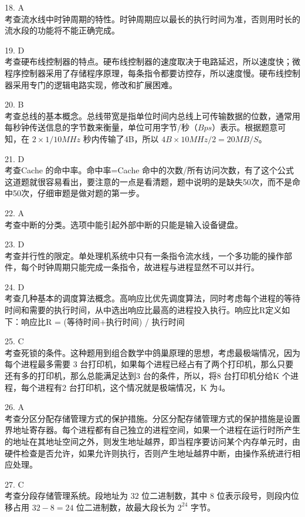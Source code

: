 18. A \\
考查流水线中时钟周期的特性。时钟周期应以最长的执行时间为准，否则用时长的流水段的功能将不能正确完成。

19. D \\
考查硬布线控制器的特点。硬布线控制器的速度取决于电路延迟，所以速度快；微程序控制器采用了存储程序原理，每条指令都要访控存，所以速度慢。硬布线控制器采用专门的逻辑电路实现，修改和扩展困难。

20. B \\
考查总线的基本概念。总线带宽是指单位时间内总线上可传输数据的位数，通常用每秒钟传送信息的字节数来衡量，单位可用字节/秒（$Bps$）表示。根据题意可知，在 $2\times1/10MHz$ 秒内传输了4B，所以 $4B\times10MHz/2=20MB/S$。

21. D \\
考查Cache 的命中率。命中率=Cache 命中的次数/所有访问次数，有了这个公式这道题就很容易看出，要注意的一点是看清题，题中说明的是缺失50次，而不是命中50次，仔细审题是做对题的第一步。

22. A \\
考查中断的分类。选项中能引起外部中断的只能是输入设备键盘。

23. D \\
考查并行性的限定。单处理机系统中只有一条指令流水线，一个多功能的操作部件，每个时钟周期只能完成一条指令，故进程与进程显然不可以并行。

24. D \\
考查几种基本的调度算法概念。高响应比优先调度算法，同时考虑每个进程的等待时间和需要的执行时间，从中选出响应比最高的进程投入执行。响应比R定义如下：响应比R = (等待时间+执行时间) / 执行时间

25. C \\
考查死锁的条件。这种题用到组合数学中鸽巢原理的思想，考虑最极端情况，因为每个进程最多需要 3 台打印机，如果每个进程已经占有了两个打印机，那么只要还有多的打印机，那么总能满足达到3 台的条件，所以，将8 台打印机分给K 个进程，每个进程有2 台打印机，这个情况就是极端情况，K 为4。

26. A \\
考查分区分配存储管理方式的保护措施。分区分配存储管理方式的保护措施是设置界地址寄存器。每个进程都有自己独立的进程空间，如果一个进程在运行时所产生的地址在其地址空间之外，则发生地址越界，即当程序要访问某个内存单元时，由硬件检查是否允许，如果允许则执行，否则产生地址越界中断，由操作系统进行相应处理。

27. C \\
考查分段存储管理系统。段地址为 $32$ 位二进制数，其中 $8$ 位表示段号，则段内位移占用 $32-8=24$ 位二进制数，故最大段长为 $2^{24}$ 字节。

